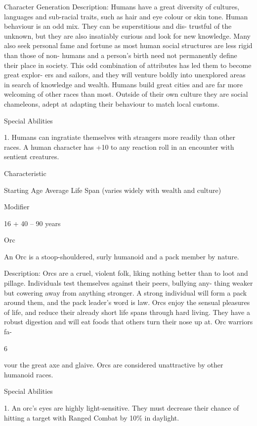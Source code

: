 \begin{Chapter}{Character Generation}
Description:  Humans  have  a  great  diversity  of 
cultures,  languages  and  sub-racial  traits,  such  as 
hair and eye colour or skin tone. Human behaviour 
is  an  odd  mix.  They  can  be  superstitious  and  dis-
trustful of the unknown, but they are also insatiably 
curious  and  look  for  new  knowledge.  Many  also 
seek  personal  fame  and  fortune  as  most  human 
social  structures  are  less  rigid  than  those  of  non-
humans and a person’s birth need not permanently 
define their place in society. This odd combination 
of  attributes  has  led  them to  become  great  explor-
ers  and  sailors,  and  they  will  venture  boldly  into 
unexplored  areas  in  search  of  knowledge  and 
wealth. Humans build great cities and are far more 
welcoming  of  other  races  than  most.  Outside  of 
their own culture they are social chameleons, adept 
at adapting their behaviour to match local customs. 

Special Abilities 

1. Humans can ingratiate themselves with strangers 
more  readily  than  other  races.  A  human  character 
has  +10  to  any  reaction  roll  in  an  encounter  with 
sentient creatures. 

Characteristic  

Starting Age  
Average Life Span (varies 
widely with wealth and culture) 

Modifier 

16 + 
40 – 90 years 

Orc 

An  Orc  is  a  stoop-shouldered,  surly  humanoid 
and a pack member by nature. 

Description:  Orcs  are  a  cruel,  violent  folk,  liking 
nothing  better  than to  loot  and  pillage.  Individuals 
test  themselves  against  their  peers,  bullying  any-
thing  weaker  but  cowering  away  from  anything 
stronger.  A  strong  individual  will  form  a  pack 
around  them,  and  the  pack  leader’s  word  is  law. 
Orcs enjoy the sensual pleasures of life, and reduce 
their  already  short  life  spans  through  hard  living. 
They  have  a  robust  digestion  and  will  eat  foods 
that  others  turn  their  nose  up  at.  Orc  warriors  fa-

6 

vour the great axe and glaive. Orcs are considered 
unattractive by other humanoid races. 

Special Abilities 

1.  An  orc’s  eyes  are  highly  light-sensitive.  They 
must  decrease  their chance  of  hitting  a  target  with 
Ranged Combat by 10\% in daylight. 


\end{Chapter}
